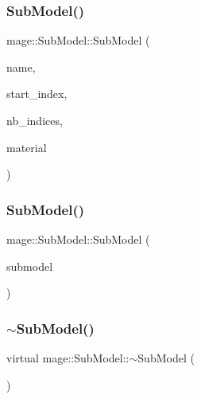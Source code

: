 \subsubsection{\texorpdfstring{Sub\+Model()}{SubModel()}\hspace{0.1cm}{\footnotesize\ttfamily [1/2]}}
{\footnotesize\ttfamily mage\+::\+Sub\+Model\+::\+Sub\+Model (\begin{DoxyParamCaption}\item[{const string \&}]{name,  }\item[{size\+\_\+t}]{start\+\_\+index,  }\item[{size\+\_\+t}]{nb\+\_\+indices,  }\item[{const \hyperlink{structmage_1_1_shaded_material}{Shaded\+Material} \&}]{material }\end{DoxyParamCaption})}

\hypertarget{classmage_1_1_sub_model_ae71dcb72fc1b06710b390c97a2db1d68}{}\label{classmage_1_1_sub_model_ae71dcb72fc1b06710b390c97a2db1d68} 
\subsubsection{\texorpdfstring{Sub\+Model()}{SubModel()}\hspace{0.1cm}{\footnotesize\ttfamily [2/2]}}
{\footnotesize\ttfamily mage\+::\+Sub\+Model\+::\+Sub\+Model (\begin{DoxyParamCaption}\item[{const \hyperlink{classmage_1_1_sub_model}{Sub\+Model} \&}]{submodel }\end{DoxyParamCaption})}

\hypertarget{classmage_1_1_sub_model_a0e92faaeeeec8d4c55c67adf4a501d0d}{}\label{classmage_1_1_sub_model_a0e92faaeeeec8d4c55c67adf4a501d0d} 
\subsubsection{\texorpdfstring{$\sim$\+Sub\+Model()}{~SubModel()}}
{\footnotesize\ttfamily virtual mage\+::\+Sub\+Model\+::$\sim$\+Sub\+Model (\begin{DoxyParamCaption}{ }\end{DoxyParamCaption})\hspace{0.3cm}{\ttfamily [virtual]}}



